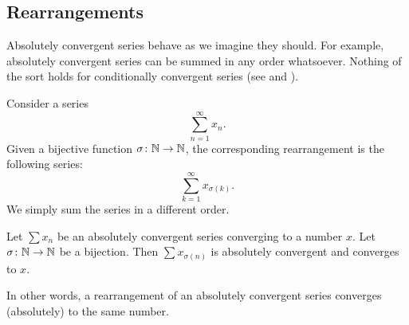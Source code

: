 \subsection{Rearrangements}

Absolutely convergent series behave as we imagine they should.  For example,
absolutely convergent series can be summed in any order whatsoever.  Nothing
of the sort holds for conditionally convergent series
(see 
and ).

Consider a series
\begin{equation*}
\sum_{n=1}^\infty x_n .
\end{equation*}
Given a bijective function $\sigma \colon {\mathbb{N}} \to {\mathbb{N}}$, the corresponding
rearrangement is the following
series:
\begin{equation*}
\sum_{k=1}^\infty x_{\sigma(k)} .
\end{equation*}
We simply sum the series in a different order.

\begin{prop}
Let $\sum x_n$ be an absolutely convergent series converging to a number
$x$.  Let $\sigma \colon {\mathbb{N}} \to {\mathbb{N}}$ be a bijection.  Then
$\sum x_{\sigma(n)}$ is absolutely convergent and converges to $x$.
\end{prop}

In other words,
a rearrangement of an absolutely convergent series converges (absolutely)
to the same number.

